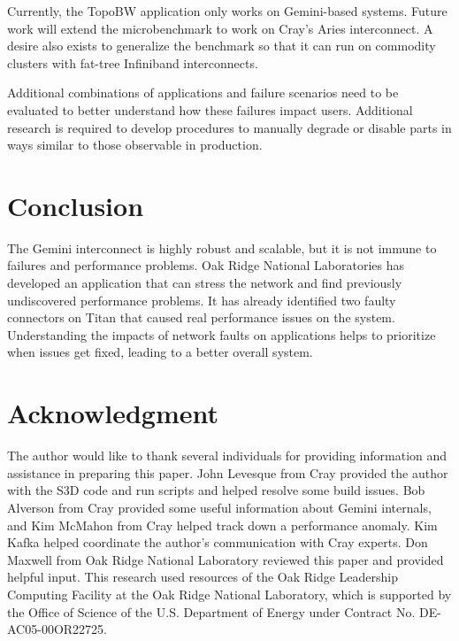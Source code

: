 \documentclass[10pt, conference, compsocconf]{IEEEtran}
\begin{document}
Currently, the TopoBW application only works on Gemini-based systems.  Future
work will extend the microbenchmark to work on Cray's Aries interconnect.  A
desire also exists to generalize the benchmark so that it can run on commodity
clusters with fat-tree Infiniband interconnects.

Additional combinations of applications and failure scenarios need to be
evaluated to better understand how these failures impact users.  Additional
research is required to develop procedures to manually degrade or disable parts
in ways similar to those observable in production.

\section{Conclusion}

The Gemini interconnect is highly robust and scalable, but it is not immune to
failures and performance problems.  Oak Ridge National Laboratories has
developed an application that can stress the network and find previously
undiscovered performance problems.  It has already identified two faulty
connectors on Titan that caused real performance issues on the system.
Understanding the impacts of network faults on applications helps to prioritize
when issues get fixed, leading to a better overall system.

\section*{Acknowledgment} The author would like to thank several individuals
for providing information and assistance in preparing this paper.  John
Levesque from Cray provided the author with the S3D code and run scripts and
helped resolve some build issues. Bob Alverson from Cray provided some useful
information about Gemini internals, and Kim McMahon from Cray helped track down
a performance anomaly.  Kim Kafka helped coordinate the author's communication
with Cray experts.  Don Maxwell from Oak Ridge National Laboratory reviewed
this paper and provided helpful input.  This research used resources of the Oak
Ridge Leadership Computing Facility at the Oak Ridge National Laboratory, which
is supported by the Office of Science of the U.S.  Department of Energy under
Contract No. DE-AC05-00OR22725. 

\end{document}
